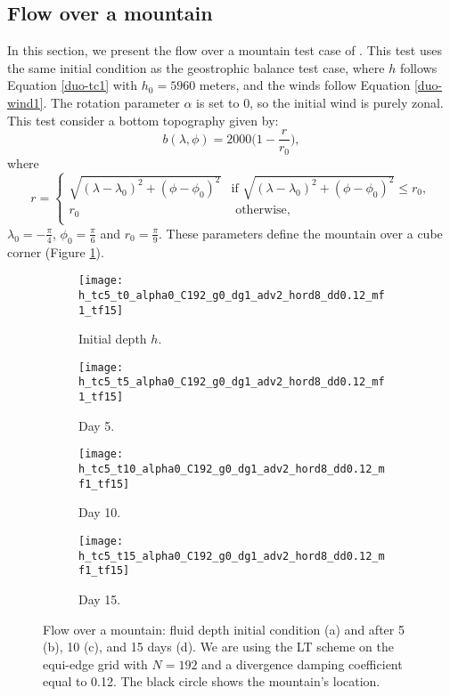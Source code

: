 \subsection{Flow over a mountain}
In this section, we present the flow over a mountain test case of \citet{will:1992}. 
This test uses the same initial condition as the geostrophic balance test case,
where $h$ follows Equation \eqref{duo-tc1} with $h_0=5960$ meters, and the winds follow Equation \eqref{duo-wind1}.
The rotation parameter $\alpha$ is set to 0, so the initial wind is purely zonal.
This test consider a bottom topography given by:
\begin{equation}
	b(\lambda,\phi) = 2000\bigg(1-\frac{r}{r_0}\bigg),
\end{equation}
where
\begin{equation}
    r =
	\begin{cases} 
		\sqrt{(\lambda-\lambda_0)^2 +  (\phi-\phi_0)^2}  & \text{if }  \sqrt{(\lambda-\lambda_0)^2 +  (\phi-\phi_0)^2} \leq r_0, \\
		r_0 &  \text{ otherwise,} \\
	\end{cases}
\end{equation}
$\lambda_0=-\frac{\pi}{4}$, $\phi_0=\frac{\pi}{6}$ and $r_0=\frac{\pi}{9}$. 
These parameters define the mountain over a cube corner (Figure \ref{sw-mountain-h-d0}).

\begin{figure}[!h]
	\centering
	\begin{subfigure}{0.48\textwidth}
		\centering
		\texttt{[image: h\_tc5\_t0\_alpha0\_C192\_g0\_dg1\_adv2\_hord8\_dd0.12\_mf1\_tf15]}
		\caption{Initial depth $h$.\label{sw-mountain-h-d0}}
	\end{subfigure}
	\begin{subfigure}{0.48\textwidth}
		\centering
		\texttt{[image: h\_tc5\_t5\_alpha0\_C192\_g0\_dg1\_adv2\_hord8\_dd0.12\_mf1\_tf15]}
		\caption{Day 5.\label{sw-mountain-h-d5}}
	\end{subfigure}

	\begin{subfigure}{0.49\textwidth}
	\centering
	\texttt{[image: h\_tc5\_t10\_alpha0\_C192\_g0\_dg1\_adv2\_hord8\_dd0.12\_mf1\_tf15]}
	\caption{Day 10.\label{sw-mountain-h-d10}}
\end{subfigure}
\begin{subfigure}{0.49\textwidth}
	\centering
	\texttt{[image: h\_tc5\_t15\_alpha0\_C192\_g0\_dg1\_adv2\_hord8\_dd0.12\_mf1\_tf15]}
	\caption{Day 15.\label{sw-mountain-h-d15}}
\end{subfigure}
	\caption{Flow over a mountain: fluid depth initial condition (a) and after 5 (b), 10 (c), and 15 days (d). 
		We are using the LT scheme on the equi-edge grid with $N=192$ and a divergence damping coefficient equal to 0.12. The black circle shows the mountain's location.
		\label{sw-mountain-h}}
\end{figure}

